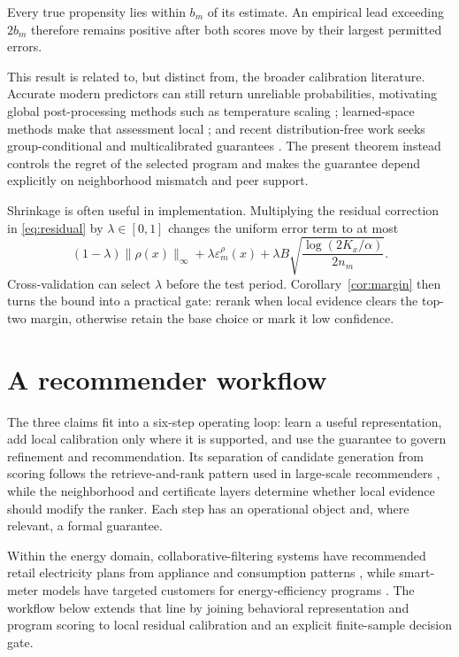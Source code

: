 \documentclass[11pt]{article}
\makeatletter
\theoremstyle{noteplain}
\theoremstyle{definition}
\renewenvironment{proof}[1][\proofname]{\par
  \pushQED{\qed}%
  \normalfont \topsep5\p@\@plus5\p@\relax
  \trivlist
  \item[\hskip\labelsep\bfseries #1\@addpunct{.}]\ignorespaces
}{%
  \popQED\endtrivlist\@endpefalse
}
\makeatother
\begin{document}
\begin{proof}
Every true propensity lies within $b_m$ of its estimate. An empirical lead exceeding $2b_m$ therefore remains positive after both scores move by their largest permitted errors.
\end{proof}

This result is related to, but distinct from, the broader calibration literature. Accurate modern predictors can still return unreliable probabilities, motivating global post-processing methods such as temperature scaling \cite{guo}; learned-space methods make that assessment local \cite{luo}; and recent distribution-free work seeks group-conditional and multicalibrated guarantees \cite{venn}. The present theorem instead controls the regret of the selected program and makes the guarantee depend explicitly on neighborhood mismatch and peer support.

Shrinkage is often useful in implementation. Multiplying the residual correction in \eqref{eq:residual} by $\lambda\in[0,1]$ changes the uniform error term to at most
\[
 (1-\lambda)\|\rho(x)\|_\infty
 +\lambda\varepsilon_m^\rho(x)+\lambda B\sqrt{\frac{\log(2K_x/\alpha)}{2n_m}}.
\]
Cross-validation can select $\lambda$ before the test period. Corollary~\ref{cor:margin} then turns the bound into a practical gate: rerank when local evidence clears the top-two margin, otherwise retain the base choice or mark it low confidence.

\section{A recommender workflow}

The three claims fit into a six-step operating loop: learn a useful representation, add local calibration only where it is supported, and use the guarantee to govern refinement and recommendation. Its separation of candidate generation from scoring follows the retrieve-and-rank pattern used in large-scale recommenders \cite{covington}, while the neighborhood and certificate layers determine whether local evidence should modify the ranker. Each step has an operational object and, where relevant, a formal guarantee.

Within the energy domain, collaborative-filtering systems have recommended retail electricity plans from appliance and consumption patterns \cite{zhangplan}, while smart-meter models have targeted customers for energy-efficiency programs \cite{liang}. The workflow below extends that line by joining behavioral representation and program scoring to local residual calibration and an explicit finite-sample decision gate.
\end{document}
